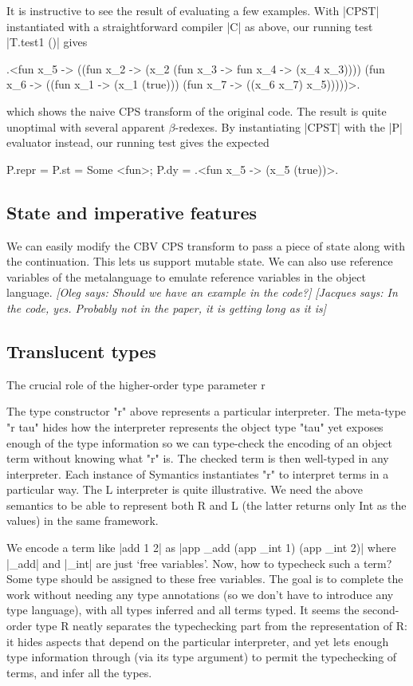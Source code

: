 \documentclass[preprint]{sigplanconf}
\newcommand{\jacques}[1]{{\it [Jacques says: #1]}}
\newcommand{\oleg}[1]{{\it [Oleg says: #1]}}
\begin{document}
It is instructive to see the result of evaluating a few examples. With 
|CPST| instantiated with a straightforward compiler |C| as above, our
running test |T.test1 ()| gives
\begin{code}
.<fun x_5 -> ((fun x_2 -> 
        (x_2 (fun x_3 -> fun x_4 -> (x_4 x_3))))
        (fun x_6 -> ((fun x_1 -> (x_1 (true))) 
        (fun x_7 -> ((x_6 x_7) x_5)))))>.
\end{code}

which shows the naive CPS transform of the original code. The result is
quite unoptimal with several apparent $\beta$-redexes. 
By instantiating |CPST| with the |P| evaluator instead, our
running test gives the expected
\begin{code}
  P.repr = {P.st = Some <fun>; P.dy = .<fun x_5 -> (x_5 (true))>.}
\end{code}

\subsection{State and imperative features}

We can easily modify the CBV CPS transform to pass a piece of state
along with the continuation. This lets us support mutable state. We
can also use reference variables of the metalanguage to emulate
reference variables in the object language.
\oleg{Should we have an example in the code?}
\jacques{In the code, yes.  Probably not in the paper, it is getting 
long as it is}

\subsection{Translucent types}

The crucial role of the higher-order type parameter r

The type constructor "r" above represents a particular interpreter.  The
meta-type "r tau" hides how the interpreter represents the object type
"tau" yet exposes enough of the type information so we can type-check
the encoding of an object term without knowing what "r" is.  The checked
term is then well-typed in any interpreter.  Each instance of Symantics
instantiates "r" to interpret terms in a particular way. The L
interpreter is quite illustrative. We need the above semantics to be
able to represent both R and L (the latter returns only Int as the
values) in the same framework.

We encode a term like |add 1 2| as
|app _add (app _int 1) (app _int 2)| where |_add| and |_int| are just
`free variables'. Now, how to typecheck such a term? Some type should
be assigned to these free variables. The goal is to complete the work
without needing any type annotations (so we don't have to introduce any
type language), with all types inferred and all terms typed. It seems
the second-order type R neatly separates the typechecking part from
the representation of R: it hides aspects that depend on the
particular interpreter, and yet lets enough type information through
(via its type argument) to permit the typechecking of terms, and infer
all the types. 
\end{document}
